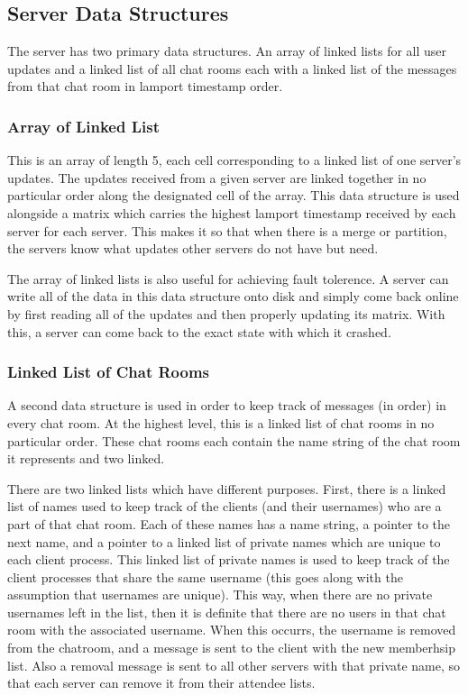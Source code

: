 \documentclass[12pt,journal,compsoc]{IEEEtran}
\begin{document}
\subsection{Server Data Structures}
The server has two primary data structures. An array of linked lists for all user updates and a linked list of all chat rooms each with a linked list of the messages from that chat room in lamport timestamp order.

\subsubsection{Array of Linked List}
This is an array of length 5, each cell corresponding to a linked list of one server's updates. The updates received from a given server are linked together in no particular order along the designated cell of the array. This data structure is used alongside a matrix which carries the highest lamport timestamp received by each server for each server. This makes it so that when there is a merge or partition, the servers know what updates other servers do not have but need.

The array of linked lists is also useful for achieving fault tolerence. A server can write all of the data in this data structure onto disk and simply come back online by first reading all of the updates and then properly updating its matrix. With this, a server can come back to the exact state with which it crashed.


\subsubsection{Linked List of Chat Rooms}
A second data structure is used in order to keep track of messages (in order) in every chat room. At the highest level, this is a linked list of chat rooms in no particular order. These chat rooms each contain the name string of the chat room it represents and two linked.

There are two linked lists which have different purposes. First, there is a linked list of names used to keep track of the clients (and their usernames) who are a part of that chat room. Each of these names has a name string, a pointer to the next name, and a pointer to a linked list of private names which are unique to each client process. This linked list of private names is used to keep track of the client processes that share the same username (this goes along with the assumption that usernames are unique). This way, when there are no private usernames left in the list, then it is definite that there are no users in that chat room with the associated username.  When this occurrs, the username is removed from the chatroom, and a message is sent to the client with the new memberhsip list.  Also a removal message is sent to all other servers with that private name, so that each server can remove it from their attendee lists.
\end{document}

